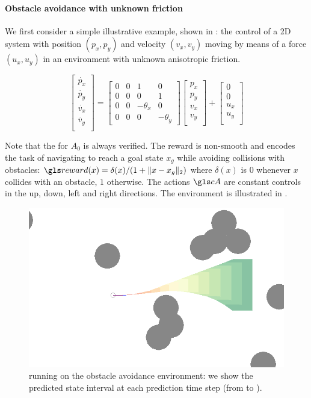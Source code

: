 \paragraph{Obstacle avoidance with unknown friction}
We first consider a simple illustrative example, shown in : the control of a 2D system with position $(p_x,p_y)$ and velocity $(v_x, v_y)$ moving by means of a force $(u_x, u_y)$ in an environment with unknown anisotropic friction.

\begin{equation*}
\begin{bmatrix}
\dot{p_x}\\
\dot{p_y}\\
\dot{v_x}\\
\dot{v_y}\\
\end{bmatrix} = 
\begin{bmatrix}
0 & 0 & 1 & 0 \\
0 & 0 & 0 & 1 \\
0 & 0 & -\theta_x & 0 \\
0 & 0 & 0 & -\theta_y
\end{bmatrix}
\begin{bmatrix}
{p_x}\\
{p_y}\\
{v_x}\\
{v_y}\\
\end{bmatrix}
+
\begin{bmatrix}
0\\
0\\
{u_x}\\
{u_y}\\
\end{bmatrix}
\end{equation*}

Note that the  for $A_0$ is always verified. The reward is non-smooth and encodes the task of navigating to reach a goal state $x_g$ while avoiding collisions with obstacles: $\R(x) = \delta(x)/(1 + \|x - x_g\|_2)$  where $\delta(x)$ is $0$ whenever $x$ collides with an obstacle, $1$ otherwise. The actions $\cA$ are constant controls in the up, down, left and right directions. The environment is illustrated in .

\begin{figure}[ht]
	\centering
	\includegraphics[width=0.7\linewidth]{img/obstacle_small}
	\caption{ running on the obstacle avoidance environment: we show the predicted state interval at each prediction time step (from  to ).}
	\label{fig:obstacle-env}
\end{figure}

